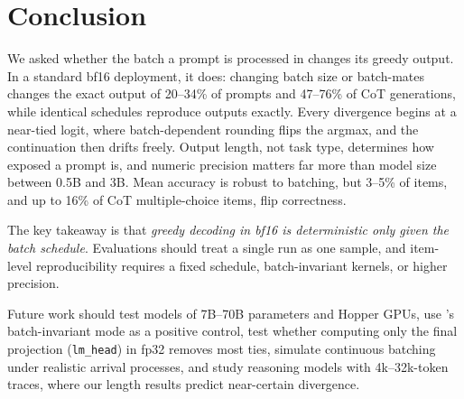 \section{Conclusion}
\label{sec:conclusion}

We asked whether the batch a prompt is processed in changes its greedy output. In a standard bf16 \vllm deployment, it does: changing batch size or batch-mates changes the exact output of 20--34\% of prompts and 47--76\% of CoT generations, while identical schedules reproduce outputs exactly. Every divergence begins at a near-tied logit, where batch-dependent rounding flips the argmax, and the continuation then drifts freely. Output length, not task type, determines how exposed a prompt is, and numeric precision matters far more than model size between 0.5B and 3B. Mean accuracy is robust to batching, but 3--5\% of items, and up to 16\% of CoT multiple-choice items, flip correctness.

The key takeaway is that \emph{greedy decoding in bf16 is deterministic only given the batch schedule}. Evaluations should treat a single run as one sample, and item-level reproducibility requires a fixed schedule, batch-invariant kernels, or higher precision.

Future work should test models of 7B--70B parameters and Hopper GPUs, use \vllm's batch-invariant mode as a positive control, test whether computing only the final projection (\texttt{lm\_head}) in fp32 removes most ties, simulate continuous batching under realistic arrival processes, and study reasoning models with 4k--32k-token traces, where our length results predict near-certain divergence.
